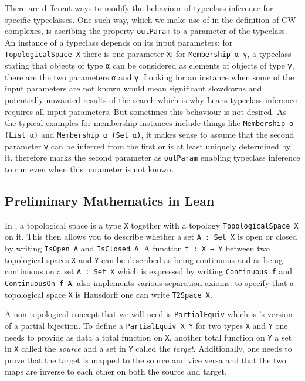 There are different ways to modify the behaviour of typeclass inference for specific typeclasses. 
One such way, which we make use of in the definition of CW complexes, is ascribing the property \lstinline|outParam| to a parameter of the typeclass. 
An instance of a typeclass depends on its input parameters: for \lstinline|TopologicalSpace X| there is one parameter \lstinline|X|; for \lstinline|Membership α γ|, a typeclass stating that objects of type \lstinline|α| can be considered as elements of objects of type \lstinline|γ|, there are the two parameters \lstinline|α| and \lstinline|γ|.
Looking for an instance when some of the input parameters are not known would mean significant slowdowns and potentially unwanted results of the search which is why Leans typeclass inference requires all input parameters. 
But sometimes this behaviour is not desired. 
As the typical examples for membership instances include things like \lstinline|Membership α (List α)| and \lstinline|Membership α (Set α)|, it makes sense to assume that the second parameter \lstinline|γ| can be inferred from the first or is at least uniquely determined by it. 
\mathlib therefore marks the second parameter as \lstinline|outParam| enabling typeclass inference to run even when this parameter is not known.

\subsection{Preliminary Mathematics in Lean}

In \mathlib, a topological space is a type \lstinline|X| together with a topology \lstinline|TopologicalSpace X| on it.
This then allows you to describe whether a set \lstinline|A : Set X| is open or closed by writing \lstinline|IsOpen A| and \lstinline|IsClosed A|. 
A function \lstinline|f : X → Y| between two topological spaces \lstinline|X| and \lstinline|Y| can be described as being continuous and as being continuous on a set \lstinline|A : Set X| which is expressed by writing \lstinline|Continuous f| and \lstinline|ContinuousOn f A|. 
\mathlib also implements various separation axioms: to specify that a topological space \lstinline|X| is Hausdorff one can write \lstinline|T2Space X|.

A non-topological concept that we will need is \lstinline|PartialEquiv| which is \mathlib's version of a partial bijection. 
To define a \lstinline|PartialEquiv X Y| for two types \lstinline|X| and \lstinline|Y| one needs to provide as data a total function on \lstinline|X|, another total function on \lstinline|Y| a set in \lstinline|X| called the \emph{source} and a set in \lstinline|Y| called the \emph{target}. 
Additionally, one needs to prove that the target is mapped to the source and vice versa and that the two maps are inverse to each other on both the source and target. 
